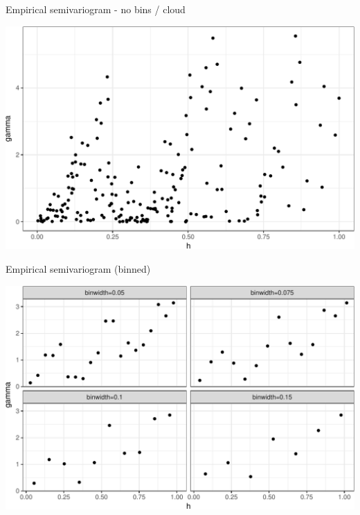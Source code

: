 \documentclass[11pt,ignorenonframetext,]{beamer}
\begin{document}
\begin{frame}{%
\protect\hypertarget{empirical-semivariogram---no-bins-cloud}{%
Empirical semivariogram - no bins / cloud}}

\begin{center}\includegraphics[width=\textwidth]{Lec13_files/figure-beamer/unnamed-chunk-5-1} \end{center}

\end{frame}

\begin{frame}{%
\protect\hypertarget{empirical-semivariogram-binned}{%
Empirical semivariogram (binned)}}

\begin{center}\includegraphics[width=\textwidth]{Lec13_files/figure-beamer/unnamed-chunk-6-1} \end{center}

\end{frame}
\end{document}

